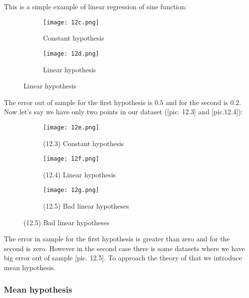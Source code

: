 This is a simple example of linear regression of sine function:
\begin{figure}[H]
  \centering
  \begin{subfigure}[c]{0.25\linewidth}
    \texttt{[image: 12c.png]}
    \caption*{Constant hypothesis}
  \end{subfigure}
  \hspace{2cm}
  \begin{subfigure}[c]{0.25\linewidth}
    \texttt{[image: 12d.png]}
    \caption*{Linear hypothesis}
  \end{subfigure}
\end{figure}
The error out of sample for the first hypothesis is $0.5$ and for the second is $0.2$. Now let's say we have only two points in our dataset ([pic. 12.3] and [pic.12.4]):
\begin{figure}[H]
  \centering
  \begin{subfigure}[c]{0.26\linewidth}
    \texttt{[image: 12e.png]}
    \caption*{(12.3) Constant hypothesis}
  \end{subfigure}
  \hspace{1cm}
  \begin{subfigure}[c]{0.26\linewidth}
    \texttt{[image: 12f.png]}
    \caption*{(12.4) Linear hypothesis}
  \end{subfigure}
  \hspace{1cm}
  \begin{subfigure}[c]{0.28\linewidth}
    \texttt{[image: 12g.png]}
    \caption*{(12.5) Bad linear hypotheses}
  \end{subfigure}
\end{figure}
The error in sample for the first hypothesis is greater than zero and for the second is zero. However in the second case there is some datasets where we have big error out of sample [pic. 12.5]. To approach the theory of that we introduce mean hypothesis.

\subsubsection*{Mean hypothesis}

